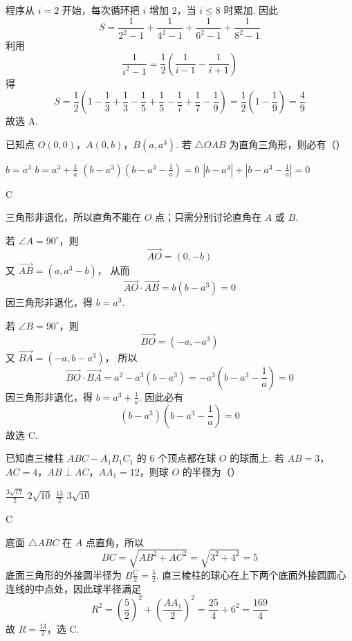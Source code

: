 \begin{solution}
程序从 \(i=2\) 开始，每次循环把 \(i\) 增加 \(2\)，当 \(i\leqslant8\) 时累加. 因此
\[
S=\frac1{2^2-1}+\frac1{4^2-1}+\frac1{6^2-1}+\frac1{8^2-1}
\]
利用
\[
\frac1{i^2-1}=\frac12\left(\frac1{i-1}-\frac1{i+1}\right)
\]
得
\[
S=\frac12\left(1-\frac13+\frac13-\frac15+\frac15-\frac17+\frac17-\frac19\right)
 =\frac12\left(1-\frac19\right)=\frac49
\]
故选 A.
\end{solution}

\begin{problem}
已知点 \(O(0,0)\)，\(A(0,b)\)，\(B(a,a^3)\). 若 \(\triangle OAB\) 为直角三角形，则必有（\quad）

\choices
    {\(b = a^3\)}
    {\(b = a^3 + \frac{1}{a}\)}
    {\((b - a^3)\left(b - a^3 - \frac{1}{a}\right) = 0\)}
    {\( |b - a^3| + \left|b - a^3 - \frac{1}{a}\right| = 0 \)}
\end{problem}

\begin{answer}
C
\end{answer}

\begin{solution}
三角形非退化，所以直角不能在 \(O\) 点；只需分别讨论直角在 \(A\) 或 \(B\).

若 \(\angle A=90^\circ\)，则
\[
\overrightarrow{AO}=(0,-b)
\]
又 \(\overrightarrow{AB}=(a,a^3-b)\)，
从而
\[
\overrightarrow{AO}\cdot\overrightarrow{AB}=b(b-a^3)=0
\]
因三角形非退化，得 \(b=a^3\).

若 \(\angle B=90^\circ\)，则
\[
\overrightarrow{BO}=(-a,-a^3)
\]
又 \(\overrightarrow{BA}=(-a,b-a^3)\)，
所以
\[
\overrightarrow{BO}\cdot\overrightarrow{BA}
 =a^2-a^3(b-a^3)
 =-a^3\left(b-a^3-\frac1a\right)=0
\]
因三角形非退化，得 \(b=a^3+\frac1a\). 因此必有
\[
\left(b-a^3\right)\left(b-a^3-\frac1a\right)=0
\]
故选 C.
\end{solution}

\begin{problem}
已知直三棱柱 \(ABC-A_{1}B_{1}C_{1}\) 的 \(6\) 个顶点都在球 \(O\) 的球面上. 若 \(AB = 3\)，\(AC = 4\)，\(AB \perp AC\)，\(AA_{1} = 12\)，则球 \(O\) 的半径为（\quad）

\choices
    {\(\frac{3\sqrt{17}}{2}\)}
    {\(2\sqrt{10}\)}
    {\(\frac{13}{2}\)}
    {\(3\sqrt{10}\)}
\end{problem}

\begin{answer}
C
\end{answer}

\begin{solution}
底面 \(\triangle ABC\) 在 \(A\) 点直角，所以
\[
BC=\sqrt{AB^2+AC^2}=\sqrt{3^2+4^2}=5
\]
底面三角形的外接圆半径为 \(B\frac{C}{2}=\frac{5}{2}\). 直三棱柱的球心在上下两个底面外接圆圆心连线的中点处，因此球半径满足
\[
R^2=\left(\frac52\right)^2+\left(\frac{AA_1}{2}\right)^2
 =\frac{25}{4}+6^2=\frac{169}{4}
\]
故 \(R=\frac{13}{2}\)，选 C.
\end{solution}


